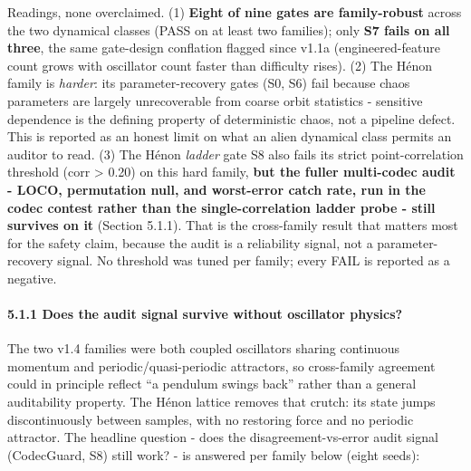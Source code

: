 \documentclass[
  11pt,
]{article}
\newcounter{none} %
\begin{document}
Readings, none overclaimed. (1) \textbf{Eight of
nine gates are family-robust} across the two
dynamical classes (PASS on at least two
families); only \textbf{S7 fails on all three},
the same gate-design conflation flagged since
v1.1a (engineered-feature count grows with
oscillator count faster than difficulty rises).
(2) The Hénon family is \emph{harder}: its
parameter-recovery gates (S0, S6) fail because
chaos parameters are largely unrecoverable from
coarse orbit statistics - sensitive dependence
is the defining property of deterministic chaos,
not a pipeline defect. This is reported as an
honest limit on what an alien dynamical class
permits an auditor to read. (3) The Hénon
\emph{ladder} gate S8 also fails its strict
point-correlation threshold (corr \textgreater{}
0.20) on this hard family, \textbf{but the
fuller multi-codec audit - LOCO, permutation
null, and worst-error catch rate, run in the
codec contest rather than the single-correlation
ladder probe - still survives on it} (Section
5.1.1). That is the cross-family result that
matters most for the safety claim, because the
audit is a reliability signal, not a
parameter-recovery signal. No threshold was
tuned per family; every FAIL is reported as a
negative.

\paragraph{5.1.1 Does the audit signal survive
without oscillator
physics?}\label{does-the-audit-signal-survive-without-oscillator-physics}

The two v1.4 families were both coupled
oscillators sharing continuous momentum and
periodic/quasi-periodic attractors, so
cross-family agreement could in principle
reflect ``a pendulum swings back'' rather than a
general auditability property. The Hénon lattice
removes that crutch: its state jumps
discontinuously between samples, with no
restoring force and no periodic attractor. The
headline question - does the
disagreement-vs-error audit signal (CodecGuard,
S8) still work? - is answered per family below
(eight seeds):
\end{document}
